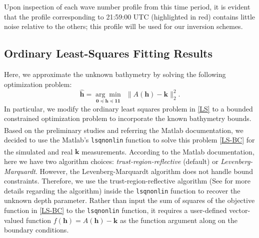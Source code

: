 Upon inspection of each wave number profile from this time period, it is evident that the profile corresponding to 21:59:00 UTC (highlighted in red) contains little noise relative to the others; this profile will be used for our inversion schemes.


\subsection{Ordinary Least-Squares Fitting Results} \label{OrdLstSqrRes}
Here, we approximate the unknown bathymetry by solving the following optimization problem:
\begin{equation}\label{LS-BC}
\mathbf{\hat{h}}= \underset{\mathbf{0} \preceq \mathbf{h} \preceq \mathbf{11} }{\arg \min} \ \  \|  A(\mathbf{h}) -  \mathbf{k} \|_2^2.
\end{equation}
In particular, we modify the ordinary least squares problem in \eqref{LS} to a bounded constrained optimization problem to incorporate the known bathymetry bounds. Based on the preliminary studies and referring the Matlab\textsuperscript{\textregistered} documentation, we decided to use the Matlab's \verb|lsqnonlin| function to solve this problem \eqref{LS-BC} for the simulated and real $\mathbf{k}$ measurements. According to the Matlab\textsuperscript{\textregistered} documentation, here we have two algorithm choices: \textit{trust-region-reflective} (default) or \textit{Levenberg-Marquardt}. However, the Levenberg-Marquardt algorithm does not handle bound constraints. Therefore, we use the trust-region-reflective algorithm (See \cite{trustregion} for more details regarding the algorithm) inside the \verb|lsqnonlin| function to recover the unknown depth parameter. Rather than input the sum of squares of the objective function in \eqref{LS-BC} to the \verb|lsqnonlin| function, it requires a user-defined vector-valued function $f(\mathbf{h}) = A(\mathbf{h}) -  \mathbf{k}$ as the function argument along on the boundary conditions. 

